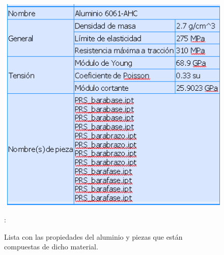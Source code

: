 \documentclass[11pt,a4paper,oldfontcommands,oneside]{memoir}
\begin{document}
\begin{flushleft}
\begin{figure}
\begin{center}
\includegraphics[scale=.85]{aluminio1.png}
\end{center}
\caption{Lista con las propiedades del aluminio y piezas que están compuestas de dicho material.}
\label{tabla3}:
\end{figure}

\end{flushleft}
\end{document}
